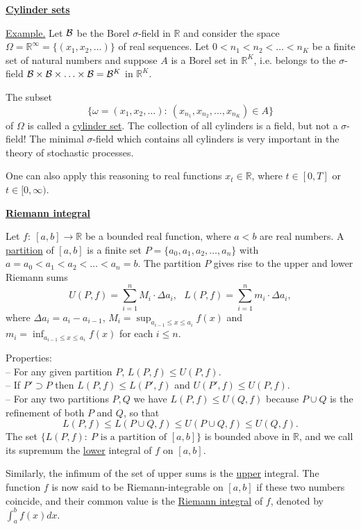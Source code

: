 \documentclass[a4paper,10pt]{article}
\def\RR{\mathbb{R}}
\newcommand{\1}[1]{\mathbf{1}_{\{#1\}}}
\begin{document}
\begin{center}\bf\underline{Cylinder sets} \end{center}

\underline{Example.} Let $\cal B$ be the Borel $\sigma$-field in $\RR$ and consider the space $\Omega=\RR^\infty=\{(x_1,x_2,\ldots)\}$ of real sequences. Let $0<n_1<n_2<\ldots<n_K$ be a finite set of natural numbers and suppose $A$ is a Borel set in $\RR^K$, i.e. belongs to the $\sigma$-field ${\cal B}\times{\cal B}\times\ldots\times{\cal B}={\cal B}^K$ in $\RR^K$.

The subset
  $$\{\omega=(x_1,x_2,\ldots):~(x_{n_1},x_{n_2},\ldots ,x_{n_K})\in A\}$$
of $\Omega$ is called a \underline{cylinder set}. The collection of all cylinders is a field, but not a $\sigma$-field! The minimal $\sigma$-field which contains all cylinders is very important in the theory of stochastic processes.

One can also apply this reasoning to real functions $x_t\in\RR$, where $t\in[0,T]$ or $t\in[0,\infty)$.\vspace{3mm}

\begin{center}\bf\underline{Riemann integral} \end{center}

Let $f:~[a,b]\to\RR$ be a bounded real function, where $a<b$ are real numbers. A \underline{partition} of $[a,b]$ is a finite set $P=\{a_0,a_1,a_2,\ldots,a_n\}$ with $a=a_0<a_1<a_2<\ldots<a_n=b$. The partition $P$ gives rise to the upper and lower Riemann sums
  $$U(P,f)=\sum_{i=1}^n M_i\cdot \Delta a_i,~~~L(P,f)=\sum_{i=1}^n m_i\cdot \Delta a_i,$$
where $\Delta a_i=a_i-a_{i-1}$, $M_i=\sup_{a_{i-1}\le x\le a_i} f(x)$ and  $m_i=\inf_{a_{i-1}\le x\le a_i} f(x)$ for each $i\le n$.\vspace{3mm}

Properties:\\
-- For any given partition $P$, $L(P,f)\le U(P,f)$.\\
-- If $P'\supset P$ then $L(P,f)\le L(P',f)$ and $U(P',f)\le U(P,f)$.\\
-- For any two partitions $P,Q$ we have $L(P,f)\le U(Q,f)$ because $P\cup Q$ is the refinement of both $P$ and $Q$, so that
  $$L(P,f)\le L(P\cup Q,f)\le U(P\cup Q,f)\le U(Q,f).$$
The set $\{L(P,f):~P \mbox{ is a partition of } [a,b]\}$ is bounded above in $\RR$, and we call its supremum the \underline{lower} integral of $f$ on $[a,b]$.\vspace{3mm}

Similarly, the infimum of the set of upper sums is the \underline{upper} integral. The function $f$ is now said to be Riemann-integrable on $[a,b]$ if these two numbers coincide, and their common value is the \underline{Riemann integral} of $f$, denoted by $\int_a^b f(x) dx$.\vspace{3mm}
\end{document}
